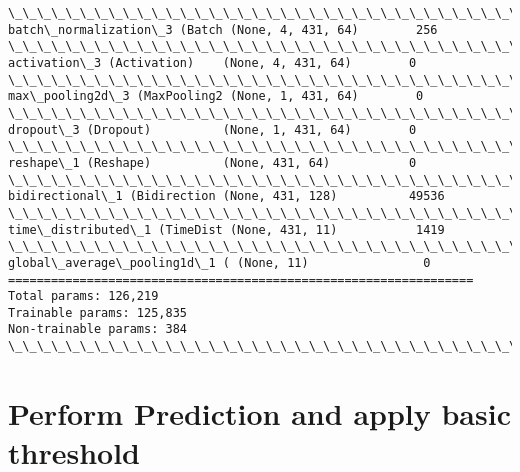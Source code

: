 \documentclass[11pt]{article}
\begin{document}
\begin{Verbatim}[commandchars=\\\{\}]
\_\_\_\_\_\_\_\_\_\_\_\_\_\_\_\_\_\_\_\_\_\_\_\_\_\_\_\_\_\_\_\_\_\_\_\_\_\_\_\_\_\_\_\_\_\_\_\_\_\_\_\_\_\_\_\_\_\_\_\_\_\_\_\_\_
batch\_normalization\_3 (Batch (None, 4, 431, 64)        256       
\_\_\_\_\_\_\_\_\_\_\_\_\_\_\_\_\_\_\_\_\_\_\_\_\_\_\_\_\_\_\_\_\_\_\_\_\_\_\_\_\_\_\_\_\_\_\_\_\_\_\_\_\_\_\_\_\_\_\_\_\_\_\_\_\_
activation\_3 (Activation)    (None, 4, 431, 64)        0         
\_\_\_\_\_\_\_\_\_\_\_\_\_\_\_\_\_\_\_\_\_\_\_\_\_\_\_\_\_\_\_\_\_\_\_\_\_\_\_\_\_\_\_\_\_\_\_\_\_\_\_\_\_\_\_\_\_\_\_\_\_\_\_\_\_
max\_pooling2d\_3 (MaxPooling2 (None, 1, 431, 64)        0         
\_\_\_\_\_\_\_\_\_\_\_\_\_\_\_\_\_\_\_\_\_\_\_\_\_\_\_\_\_\_\_\_\_\_\_\_\_\_\_\_\_\_\_\_\_\_\_\_\_\_\_\_\_\_\_\_\_\_\_\_\_\_\_\_\_
dropout\_3 (Dropout)          (None, 1, 431, 64)        0         
\_\_\_\_\_\_\_\_\_\_\_\_\_\_\_\_\_\_\_\_\_\_\_\_\_\_\_\_\_\_\_\_\_\_\_\_\_\_\_\_\_\_\_\_\_\_\_\_\_\_\_\_\_\_\_\_\_\_\_\_\_\_\_\_\_
reshape\_1 (Reshape)          (None, 431, 64)           0         
\_\_\_\_\_\_\_\_\_\_\_\_\_\_\_\_\_\_\_\_\_\_\_\_\_\_\_\_\_\_\_\_\_\_\_\_\_\_\_\_\_\_\_\_\_\_\_\_\_\_\_\_\_\_\_\_\_\_\_\_\_\_\_\_\_
bidirectional\_1 (Bidirection (None, 431, 128)          49536     
\_\_\_\_\_\_\_\_\_\_\_\_\_\_\_\_\_\_\_\_\_\_\_\_\_\_\_\_\_\_\_\_\_\_\_\_\_\_\_\_\_\_\_\_\_\_\_\_\_\_\_\_\_\_\_\_\_\_\_\_\_\_\_\_\_
time\_distributed\_1 (TimeDist (None, 431, 11)           1419      
\_\_\_\_\_\_\_\_\_\_\_\_\_\_\_\_\_\_\_\_\_\_\_\_\_\_\_\_\_\_\_\_\_\_\_\_\_\_\_\_\_\_\_\_\_\_\_\_\_\_\_\_\_\_\_\_\_\_\_\_\_\_\_\_\_
global\_average\_pooling1d\_1 ( (None, 11)                0         
=================================================================
Total params: 126,219
Trainable params: 125,835
Non-trainable params: 384
\_\_\_\_\_\_\_\_\_\_\_\_\_\_\_\_\_\_\_\_\_\_\_\_\_\_\_\_\_\_\_\_\_\_\_\_\_\_\_\_\_\_\_\_\_\_\_\_\_\_\_\_\_\_\_\_\_\_\_\_\_\_\_\_\_

    \end{Verbatim}

    \section{Perform Prediction and apply basic
threshold}\label{perform-prediction-and-apply-basic-threshold}
\end{document}
